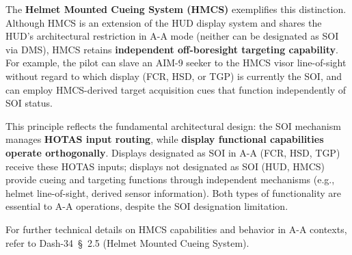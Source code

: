 \documentclass[11pt,a4paper]{article}
\providecommand{\dashref}[1]{Dash-34~\S~#1}
\begin{document}
The \textbf{Helmet Mounted Cueing System (HMCS)} exemplifies this distinction. Although HMCS is an extension of the HUD display system and shares the HUD's architectural restriction in A-A mode (neither can be designated as SOI via DMS), HMCS retains \textbf{independent off-boresight targeting capability}. For example, the pilot can slave an AIM-9 seeker to the HMCS visor line-of-sight without regard to which display (FCR, HSD, or TGP) is currently the SOI, and can employ HMCS-derived target acquisition cues that function independently of SOI status.

This principle reflects the fundamental architectural design: the SOI mechanism manages \textbf{HOTAS input routing}, while \textbf{display functional capabilities operate orthogonally}. Displays designated as SOI in A-A (FCR, HSD, TGP) receive these HOTAS inputs; displays not designated as SOI (HUD, HMCS) provide cueing and targeting functions through independent mechanisms (e.g., helmet line-of-sight, derived sensor information). Both types of functionality are essential to A-A operations, despite the SOI designation limitation.

For further technical details on HMCS capabilities and behavior in A-A contexts, refer to \dashref{2.5} (Helmet Mounted Cueing System).



\end{document}
